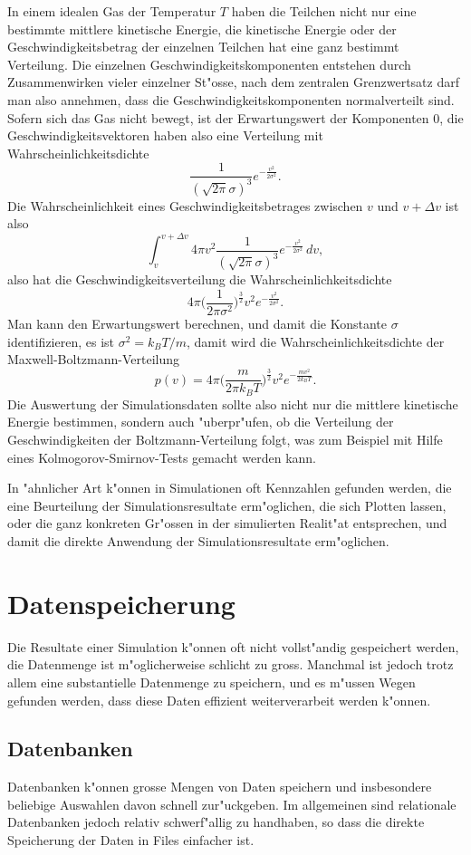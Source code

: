 \begin{beispiel}
In einem idealen Gas der Temperatur $T$ haben die Teilchen nicht nur
eine bestimmte mittlere kinetische Energie, die kinetische Energie
oder der Geschwindigkeitsbetrag
der einzelnen Teilchen hat eine ganz bestimmt Verteilung.
Die einzelnen Geschwindigkeitskomponenten entstehen durch Zusammenwirken
vieler einzelner St"osse, nach dem zentralen Grenzwertsatz darf man also
annehmen, dass die Geschwindigkeitskomponenten normalverteilt sind.
Sofern sich das Gas nicht bewegt, ist der Erwartungswert der Komponenten
0, die Geschwindigkeitsvektoren haben also eine Verteilung mit
Wahrscheinlichkeitsdichte
\[
\frac1{(\sqrt{2\pi}\sigma)^3}e^{-\frac{v^2}{2\sigma^2}}.
\]
Die Wahrscheinlichkeit eines Geschwindigkeitsbetrages zwischen $v$ und
$v+\Delta v$ ist also
\[
\int_v^{v+\Delta v} 4\pi v^2
\frac1{(\sqrt{2\pi}\sigma)^3}e^{-\frac{v^2}{2\sigma^2}}\,dv,
\]
also hat die Geschwindigkeitsverteilung die Wahrscheinlichkeitsdichte
\[
4\pi
\biggl(
\frac{1}{2\pi \sigma^2}
\biggr)^{\frac32}
v^2 e^{-\frac{v^2}{2\sigma^2}}.
\]
Man kann den Erwartungswert berechnen, und damit die Konstante $\sigma$
identifizieren, es ist $\sigma^2=k_BT/m$, damit wird die 
Wahrscheinlichkeitsdichte der Maxwell-Boltzmann-Verteilung
\[
p(v)=
4\pi\biggl(\frac{m}{2\pi k_BT}\biggr)^\frac32 v^2 e^{-\frac{mv^2}{2k_BT}}.
\]
Die Auswertung der Simulationsdaten sollte also nicht nur die mittlere
kinetische Energie bestimmen, sondern auch "uberpr"ufen, ob die Verteilung
der Geschwindigkeiten der Boltzmann-Verteilung folgt, was zum Beispiel mit
Hilfe eines Kolmogorov-Smirnov-Tests gemacht werden kann.
\end{beispiel}

In "ahnlicher Art k"onnen in Simulationen oft Kennzahlen gefunden werden,
die eine Beurteilung der Simulationsresultate erm"oglichen, die sich
Plotten lassen, oder die ganz konkreten Gr"ossen in der simulierten
Realit"at entsprechen, und damit die direkte Anwendung der
Simulationsresultate erm"oglichen.

\section{Datenspeicherung}
Die Resultate einer Simulation k"onnen oft nicht vollst"andig gespeichert
werden, die Datenmenge ist m"oglicherweise schlicht zu gross.
Manchmal ist jedoch trotz allem eine substantielle Datenmenge zu
speichern, und es m"ussen Wegen gefunden werden, dass diese Daten
effizient weiterverarbeit werden k"onnen.

\subsection{Datenbanken}
Datenbanken k"onnen grosse Mengen von Daten speichern und insbesondere
beliebige Auswahlen davon schnell zur"uckgeben.
Im allgemeinen sind relationale Datenbanken jedoch relativ 
schwerf"allig zu handhaben, so dass die direkte Speicherung
der Daten in Files einfacher ist.

